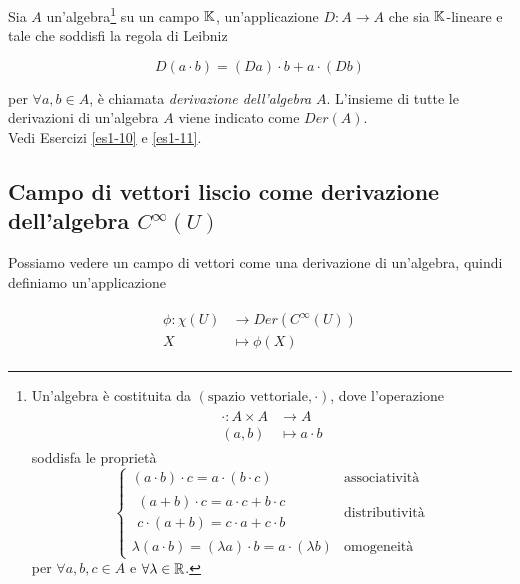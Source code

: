 Sia $ A $ un'algebra\footnote{%
	Un'algebra è costituita da $ (\text{spazio vettoriale},\cdot) $, dove l'operazione
		\begin{align}
			\begin{split}
				\cdot : A \times A &\to A\\
				(a,b) &\mapsto a \cdot b
			\end{split}
		\end{align}
	soddisfa le proprietà
	\begin{equation}
		\begin{cases}
			(a \cdot b) \cdot c = a \cdot (b \cdot c) & \text{associatività}\\
			\begin{split}
				(a + b) \cdot c = a \cdot c + b \cdot c\\
				c \cdot (a + b) = c \cdot a + c \cdot b
			\end{split} & \text{distributività}\\
			\lambda (a \cdot b) = (\lambda a) \cdot b = a \cdot (\lambda b) & \text{omogeneità}
		\end{cases}
	\end{equation}
	per $ \forall a,b,c \in A $ e $ \forall \lambda \in \mathbb{R} $.%
} su un campo $ \mathbb{K} $, un'applicazione $ D : A \to A $ che sia $ \mathbb{K} $-lineare e tale che soddisfi la regola di Leibniz

\begin{equation}
	D (a \cdot b) = (D a) \cdot b + a \cdot (D b)
\end{equation}

per $ \forall a,b \in A $, è chiamata \textit{derivazione dell'algebra} $ A $. L'insieme di tutte le derivazioni di un'algebra $ A $ viene indicato come $ Der(A) $.\\
Vedi Esercizi \ref{es1-10} e \ref{es1-11}.

\subsection{Campo di vettori liscio come derivazione dell'algebra $ C^{\infty}(U) $}

Possiamo vedere un campo di vettori come una derivazione di un'algebra, quindi definiamo un'applicazione

\begin{align}
	\begin{split}
		\phi : \chi(U) &\to Der(C^{\infty}(U))\\
		X &\mapsto \phi(X)
	\end{split}
\end{align}

